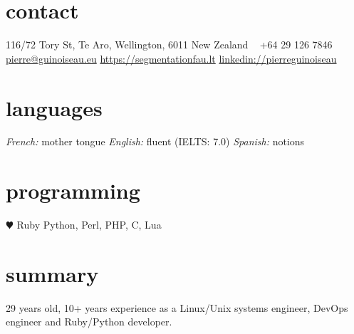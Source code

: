 \documentclass[]{friggeri-cv} %
\begin{document}



\begin{aside} %
\section{contact}
116/72 Tory St,
Te Aro,
Wellington, 6011
New Zealand
~
+64 29 126 7846
~
\href{mailto:pierre@guinoiseau.eu}{pierre@guinoiseau.eu}
\href{https://segmentationfau.lt}{https://segmentationfau.lt}
\href{https://linkedin.com/in/pierreguinoiseau}{linkedin://pierreguinoiseau}
\section{languages}
\textit{French:} mother tongue
\textit{English:} fluent
(IELTS: 7.0)
\textit{Spanish:} notions
\section{programming}
{\color{red} $\varheartsuit$} Ruby
Python, Perl, PHP, C, Lua
\end{aside}


\section{summary}

29 years old, 10+ years experience as a Linux/Unix systems engineer, DevOps engineer and Ruby/Python developer. \\

\end{document}
